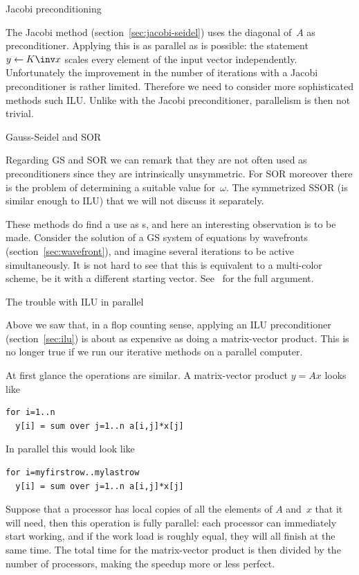  {Jacobi preconditioning}

The Jacobi method (section~\ref{sec:jacobi-seidel}) uses the diagonal
of~$A$ as preconditioner. Applying this is as parallel as is
possible: the statement $y\leftarrow K\inv x$ scales every element of
the input vector independently. Unfortunately the improvement in the
number of iterations with a Jacobi preconditioner is rather
limited. Therefore we need to consider more sophisticated methods such
\ac{ILU}. Unlike with the Jacobi preconditioner, parallelism is then
not trivial.

 {Gauss-Seidel and SOR}

Regarding \ac{GS} and \ac{SOR} we can remark that they are not often used as
preconditioners since they are intrinsically unsymmetric.
For \ac{SOR} moreover there is the problem of determining a suitable
value for~$\omega$.
The symmetrized \ac{SSOR} (is similar enough to \ac{ILU}) that we
will not discuss it separately.

These methods do find a use as s,
and here an interesting observation is to be made.
Consider the solution of a \ac{GS} system of equations by wavefronts
(section~\ref{sec:wavefront}),
and imagine several iterations to be active simultaneously.
It is not hard to see that this is equivalent to a multi-color
scheme, be it with a different starting vector.
See~\cite{AdJo:colorblind} for the full argument.

 {The trouble with ILU in parallel}

Above we saw that, in a flop counting sense, applying an ILU
preconditioner (section~\ref{sec:ilu}) is about as expensive as doing
a matrix-vector product. This is no longer true if we run our
iterative methods on a parallel computer.

At first glance the operations are similar. A matrix-vector product
$y=Ax$ looks like
\begin{verbatim}
for i=1..n
  y[i] = sum over j=1..n a[i,j]*x[j]
\end{verbatim}
In parallel this would look like
\begin{verbatim}
for i=myfirstrow..mylastrow
  y[i] = sum over j=1..n a[i,j]*x[j]
\end{verbatim}
Suppose that a processor has local copies of all the elements of $A$
and~$x$ that it will need, then this operation is fully parallel: each
processor can immediately start working, and if the work load is
roughly equal, they will all finish at the same time. The total time
for the matrix-vector product is then divided by the number of
processors, making the speedup more or less perfect.

